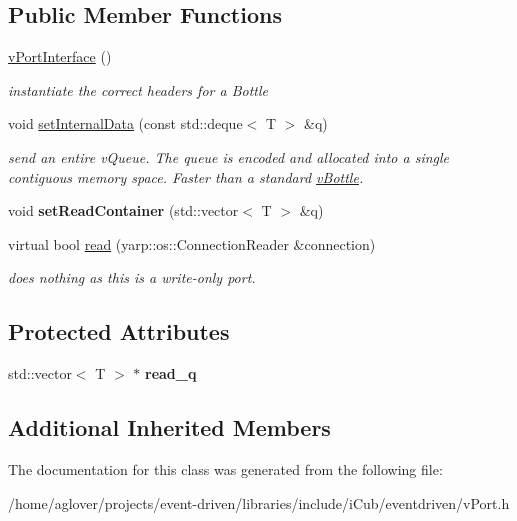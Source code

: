 \subsection*{Public Member Functions}
\begin{DoxyCompactItemize}
\item 
\hyperlink{classev_1_1vPortInterface_a00678ecec3a0ed7f7fd45257e77948a7}{v\+Port\+Interface} ()\hypertarget{classev_1_1vPortInterface_a00678ecec3a0ed7f7fd45257e77948a7}{}\label{classev_1_1vPortInterface_a00678ecec3a0ed7f7fd45257e77948a7}

\begin{DoxyCompactList}\small\item\em instantiate the correct headers for a Bottle \end{DoxyCompactList}\item 
void \hyperlink{classev_1_1vPortInterface_aacb840f390ac2f41f8149f1b57d84d6a}{set\+Internal\+Data} (const std\+::deque$<$ T $>$ \&q)\hypertarget{classev_1_1vPortInterface_aacb840f390ac2f41f8149f1b57d84d6a}{}\label{classev_1_1vPortInterface_aacb840f390ac2f41f8149f1b57d84d6a}

\begin{DoxyCompactList}\small\item\em send an entire v\+Queue. The queue is encoded and allocated into a single contiguous memory space. Faster than a standard \hyperlink{classev_1_1vBottle}{v\+Bottle}. \end{DoxyCompactList}\item 
void {\bfseries set\+Read\+Container} (std\+::vector$<$ T $>$ \&q)\hypertarget{classev_1_1vPortInterface_a200a3e8af8a0704f43393137ccc242b0}{}\label{classev_1_1vPortInterface_a200a3e8af8a0704f43393137ccc242b0}

\item 
virtual bool \hyperlink{classev_1_1vPortInterface_a1ada068fcd3aaec7ef15ecc97d194b09}{read} (yarp\+::os\+::\+Connection\+Reader \&connection)\hypertarget{classev_1_1vPortInterface_a1ada068fcd3aaec7ef15ecc97d194b09}{}\label{classev_1_1vPortInterface_a1ada068fcd3aaec7ef15ecc97d194b09}

\begin{DoxyCompactList}\small\item\em does nothing as this is a write-\/only port. \end{DoxyCompactList}\end{DoxyCompactItemize}
\subsection*{Protected Attributes}
\begin{DoxyCompactItemize}
\item 
std\+::vector$<$ T $>$ $\ast$ {\bfseries read\+\_\+q}\hypertarget{classev_1_1vPortInterface_a9ecff2b85e399f4b9d53c41988e178e0}{}\label{classev_1_1vPortInterface_a9ecff2b85e399f4b9d53c41988e178e0}

\end{DoxyCompactItemize}
\subsection*{Additional Inherited Members}


The documentation for this class was generated from the following file\+:\begin{DoxyCompactItemize}
\item 
/home/aglover/projects/event-\/driven/libraries/include/i\+Cub/eventdriven/v\+Port.\+h\end{DoxyCompactItemize}
